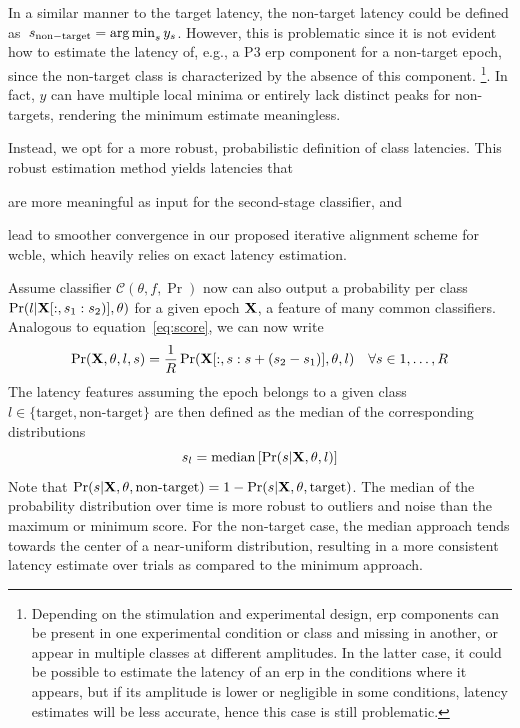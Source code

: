 In a similar manner to the target latency, the non-target latency could be defined
as~$s_\mathrm{non-target}=\operatorname*{arg\,min}_s{y_s}$.
However, this is problematic since it is not evident how to estimate
the latency of, e.g., a P3 \ac{erp} component for a non-target epoch, since the
non-target class is characterized by the absence of this component.
\footnote{Depending on the stimulation and experimental design, \ac{erp} components can be present in one experimental
	condition or class and missing in another, or appear in multiple classes
	at different amplitudes. In the latter case, it could be possible
	to estimate the latency of an \ac{erp} in the conditions where it appears, but if
	its amplitude is lower or negligible in some conditions, latency estimates
	will be less accurate, hence this case is still problematic.}.
In fact, $y$ can have multiple local minima or entirely lack distinct peaks for
non-targets, rendering the minimum estimate meaningless.

Instead, we opt for a more robust, probabilistic definition of class latencies.
This robust estimation method yields latencies that
\begin{enumerate*}[label=(\arabic*)]
  \item are more meaningful as input for the second-stage
    classifier, and
  \item lead to smoother convergence in our proposed iterative alignment scheme
    for \ac{wcble}, which heavily relies on exact latency estimation.
\end{enumerate*}
Assume classifier $\mathcal{C}(\theta,f,\Pr)$ now can also output a probability
per class $\Pr(l|
\mathbf{X}[:,s_1:s_2)], \theta)$ for a given epoch $\mathbf{X}$, a feature of many
common classifiers.
Analogous to equation~\ref{eq:score}, we can now write
\begin{equation}
\Pr(\mathbf{X},\theta,l,s) = \frac{1}{R}\Pr(\mathbf{X}[:,s:s+(s_2-s_1)],\theta,l)
  \quad \forall s\in 1,\ldots,R
	\label{eq:prob}
\end{equation}
The latency features assuming the epoch belongs to a given class
$l\in\{\textrm{target},\textrm{non-target}\}$ are then defined as the median of
the corresponding distributions
\begin{equation}
  s_l =\mathrm{median}\left[\Pr(s|\mathbf{X},\theta,l) \right]
  \label{eq:prob-latency}
\end{equation}
Note that $\Pr(s|\mathbf{X},\theta,\textrm{non-target}) =1-
  \Pr(s|\mathbf{X},\theta,\mathrm{target})$.
The median of the probability distribution over time is more robust to
outliers and noise than the maximum or minimum score.
For the non-target case, the median approach tends towards the center of a
near-uniform distribution, resulting in a more consistent latency estimate over
trials as compared to the minimum approach.


